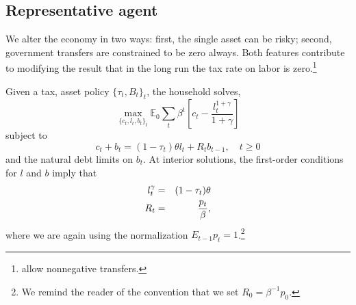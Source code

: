 \documentclass[thmsb,11pt]{article}
\begin{document}
\subsection{Representative agent}
\label{Sec: rep agent}

We alter the  \citet{Aiyagari2002} economy  in two ways:  first,  the single  asset  can  be risky; %
 second, government transfers are constrained to be zero always. Both  features
contribute to modifying  the \citeauthor{Aiyagari2002}  result that in the long run the tax rate on labor is zero.\footnote{\citeauthor{Aiyagari2002} allow nonnegative  transfers.}

Given a tax, asset policy $\{\tau_t,B_t\}_t$, the household solves,
\begin{equation}
 \max_{\{c_t,l_t,b_{t}\}_t}\mathbb{E}_0\sum_{t}\beta^t \left[c_t-\frac{l_t^{1+\gamma}}{1+\gamma}\right]
\end{equation}
subject to
\begin{equation}\label{eqn:recurbud1}
c_t+b_{t}=(1-\tau_t)\theta l_t+R_tb_{t-1} , \quad t\geq 0
\end{equation}
and the natural debt limits on $b_t$. At interior solutions, the first-order conditions %
for $l$ and $b$ imply that
\begin{eqnarray*}
l_t^\gamma & = &(1-\tau_t) \theta \cr
R_t & = & \frac{p_t}{\beta},
\end{eqnarray*}
where we are again using the normalization $E_{t-1} p_t = 1$.\footnote{We  remind the reader of  the convention  that we set  $R_{0}=\beta^{-1} p_0$.}
\end{document}
